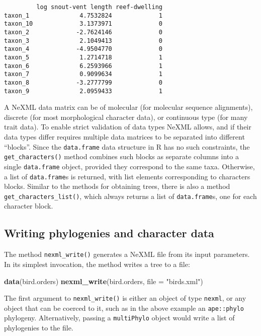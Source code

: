 \documentclass[author-year, review, 11pt]{components/elsarticle} %
\newenvironment{Shaded}{\begin{snugshade}}{\end{snugshade}}
\newcommand{\KeywordTok}[1]{\textcolor[rgb]{0.13,0.29,0.53}{\textbf{{#1}}}}
\newcommand{\DataTypeTok}[1]{\textcolor[rgb]{0.13,0.29,0.53}{{#1}}}
\newcommand{\StringTok}[1]{\textcolor[rgb]{0.31,0.60,0.02}{{#1}}}
\newcommand{\NormalTok}[1]{{#1}}
\begin{document}
\begin{verbatim}
         log snout-vent length reef-dwelling
taxon_1              4.7532824             1
taxon_10             3.1373971             0
taxon_2             -2.7624146             0
taxon_3              2.1049413             0
taxon_4             -4.9504770             0
taxon_5              1.2714718             1
taxon_6              6.2593966             1
taxon_7              0.9099634             1
taxon_8             -3.2777799             0
taxon_9              2.0959433             1
\end{verbatim}

A NeXML data matrix can be of molecular (for molecular sequence
alignments), discrete (for most morphological character data), or
continuous type (for many trait data). To enable strict validation of
data types NeXML allows, and if their data types differ requires
multiple data matrices to be separated into different ``blocks''. Since
the \texttt{data.frame} data structure in R has no such constraints, the
\texttt{get\_characters()} method combines such blocks as separate
columns into a single \texttt{data.frame} object, provided they
correspond to the same taxa. Otherwise, a list of \texttt{data.frame}s
is returned, with list elements corresponding to characters blocks.
Similar to the methods for obtaining trees, there is also a method
\texttt{get\_characters\_list()}, which always returns a list of
\texttt{data.frame}s, one for each character block.

\subsection{Writing phylogenies and character
data}\label{writing-phylogenies-and-character-data}

The method \texttt{nexml\_write()} generates a NeXML file from its input
parameters. In its simplest invocation, the method writes a tree to a
file:

\begin{Shaded}
\begin{Highlighting}[]
\KeywordTok{data}\NormalTok{(bird.orders)}
\KeywordTok{nexml_write}\NormalTok{(bird.orders, }\DataTypeTok{file =} \StringTok{"birds.xml"}\NormalTok{)}
\end{Highlighting}
\end{Shaded}

The first argument to \texttt{nexml\_write()} is either an object of
type \texttt{nexml}, or any object that can be coerced to it, such as in
the above example an \texttt{ape::phylo} phylogeny. Alternatively,
passing a \texttt{multiPhylo} object would write a list of phylogenies
to the file.
\end{document}
